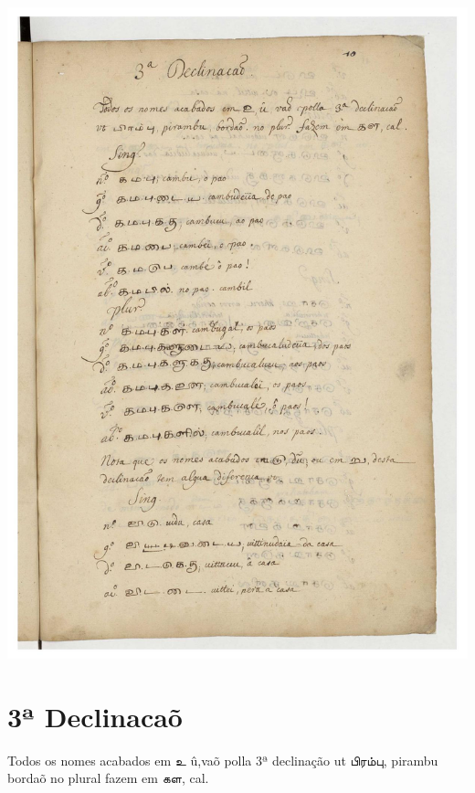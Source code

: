 \documentclass[12pt,a4paper]{scrbook}
\begin{document}
      
\newpage
\hypertarget{img-29}{
    \includegraphics[width=\textwidth]{img-29}}
\newpage
      \chapter*{3ª Declinacaõ}
    
      

 Todos os nomes acabados em உ û,vaõ polla 3ª declinação 
             ut பிரம்பு, pirambu bordaõ no plural fazem em கள, cal.
        
\end{document}
